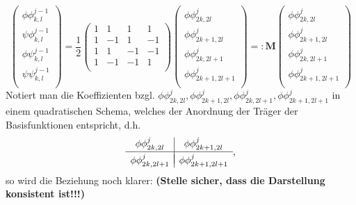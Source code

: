 \[
\begin{pmatrix}
\phi\phi_{k,l}^{j-1} \\
\psi\phi_{k,l}^{j-1} \\
\phi\psi_{k,l}^{j-1} \\
\psi\psi_{k,l}^{j-1} \\
\end{pmatrix}
= \frac{1}{2}
\begin{pmatrix}
1 & 1 & 1 & 1 \\
1 & -1 & 1 & -1 \\
1 & 1 & -1 & -1 \\
1 & -1 & -1 & 1 \\
\end{pmatrix}
\begin{pmatrix}
\phi\phi_{2k,2l}^{j} \\
\phi\phi_{2k+1,2l}^{j} \\
\phi\phi_{2k,2l+1}^{j} \\
\phi\phi_{2k+1,2l+1}^{j} \\
\end{pmatrix}
=:
\mathbf{M}
\begin{pmatrix}
\phi\phi_{2k,2l}^{j} \\
\phi\phi_{2k+1,2l}^{j} \\
\phi\phi_{2k,2l+1}^{j} \\
\phi\phi_{2k+1,2l+1}^{j} \\
\end{pmatrix}
\]
%
Notiert man die Koeffizienten bzgl. $\phi\phi_{2k,2l}^{j}, \phi\phi_{2k+1,2l}^{j}, \phi\phi_{2k,2l+1}^{j}, \phi\phi_{2k+1,2l+1}^{j}$ in einem quadratischen Schema, welches der Anordnung der Träger der Basisfunktionen entspricht, d.h.
%
\[
\begin{array}{c|c}
\phi\phi_{2k,2l}^{j} & \phi\phi_{2k+1,2l}^{j} \\[.05cm] 
\hline \\[-0.35cm]
\phi\phi_{2k,2l+1}^{j} & \phi\phi_{2k+1,2l+1}^{j}
\end{array}
,
\]
%
so wird die Beziehung noch klarer: \textbf{(Stelle sicher, dass die Darstellung konsistent ist!!!)}
%
